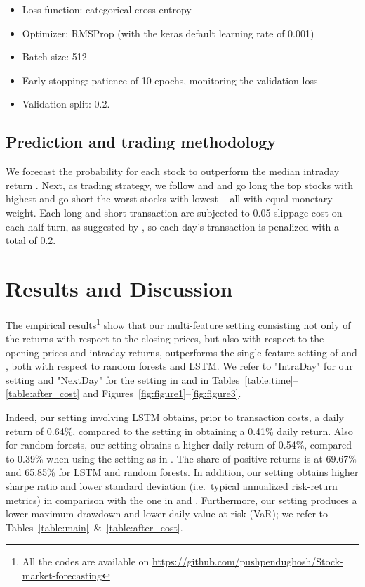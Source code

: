 \documentclass[review]{elsarticle}
\begin{document}
\begin{itemize}
    \item Loss function: categorical cross-entropy
    \item Optimizer: RMSProp (with the keras default learning rate of 0.001)
    \item Batch size: 512
    \item Early stopping: patience of 10 epochs, monitoring the validation loss
    \item Validation split: 0.2.
\end{itemize}
\subsection{Prediction and trading methodology}
We forecast the probability  for each stock  to outperform the median intraday return . Next, as trading strategy, we follow \cite{krauss17} and \cite{krauss18}
and go long the top  stocks with highest  and go short 
the worst  stocks with lowest  -- all with equal monetary weight.  Each long and short transaction are subjected to 0.05 slippage cost on each half-turn, as suggested by \cite{avellaneda2010statistical}, so each day's transaction is penalized with a total of 0.2. 



\section{Results and Discussion}\label{sec:result}




    
    







The empirical results\footnote{All the codes are available on \url{https://github.com/pushpendughosh/Stock-market-forecasting}} 
show that our multi-feature setting consisting not only of the returns with respect to the closing prices, but also with respect to the opening prices and intraday returns, outperforms the single feature setting of \cite{krauss17} and \cite{krauss18}, both with respect to random forests and LSTM. We refer to  "IntraDay" for our setting and "NextDay" for the setting in \cite{krauss17} and \cite{krauss18} in Tables~\ref{table:time}--\ref{table:after_cost} and Figures~\ref{fig:figure1}--\ref{fig:figure3}.

Indeed, our setting involving LSTM obtains, prior to transaction costs, a daily return of 0.64\%, compared to the setting in \cite{krauss18} obtaining a 0.41\% daily return. Also for random forests, our setting obtains a higher daily return of 0.54\%, compared to 0.39\% when using the setting as in \cite{krauss17}. The share of positive returns is at 69.67\% and 65.85\%  for LSTM and random forests. In addition,
our setting obtains 
higher sharpe ratio and lower standard deviation (i.e.\ typical annualized risk-return metrics) in comparison with the one in \cite{krauss17} and \cite{krauss18}. Furthermore, our setting produces a lower maximum drawdown and lower daily value at risk (VaR); we refer to Tables~\ref{table:main}~\&~\ref{table:after_cost}. 
\end{document}
